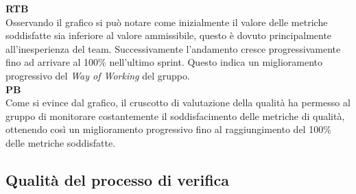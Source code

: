 \begin{flushleft}
\textbf{RTB} \\
Osservando il grafico si può notare come inizialmente il valore delle metriche soddisfatte sia inferiore al valore ammissibile, questo è dovuto principalmente all'inesperienza del team. Successivamente l'andamento cresce progressivamente fino ad arrivare al 100\% nell'ultimo sprint. Questo indica un miglioramento progressivo del \textit{Way of Working} del gruppo. \\

\textbf{PB} \\
Come si evince dal grafico, il cruscotto di valutazione della qualità ha permesso al gruppo di monitorare costantemente il soddisfacimento delle metriche di qualità, ottenendo così un miglioramento progressivo fino al raggiungimento del 100\% delle metriche soddisfatte.
\end{flushleft}

\newpage
\subsection{Qualità del processo di verifica}
